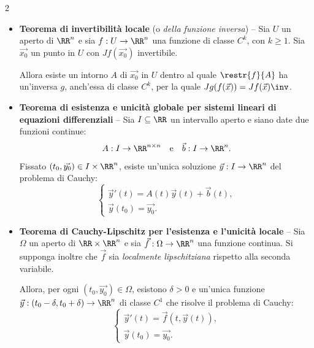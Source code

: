 \begin{multicols*}{2}
\begin{itemize}
            \item \textbf{Teorema di invertibilità locale} (o \textit{della funzione inversa}) -- Sia $U$ un aperto di $\RR^n$ e sia $f : U \to \RR^n$ una
                  funzione di classe $C^k$, con $k \geq 1$. Sia $\vec{x_0}$ un punto in $U$ con $J f(\vec{x_0})$ invertibile. \smallskip

                  Allora esiste un
                  intorno $A$ di $\vec{x_0}$ in $U$ dentro al quale $\restr{f}{A}$ ha un'inversa $g$, anch'essa di classe
                  $C^k$, per la quale $J g(f(\vec{x})) = J f(\vec{x})\inv$.

            \item \textbf{Teorema di esistenza e unicità globale per sistemi lineari di equazioni differenziali} --
                  Sia $I \subseteq \RR$ un intervallo aperto e siano date due funzioni continue:
                  \[ A : I \to \RR^{n \times n} \quad \text{e} \quad \vec{b} : I \to \RR^n. \]
                  Fissato $(t_0, \vec{y_0}) \in I \times \RR^n$, esiste un'unica soluzione $\vec{y} : I \to \RR^n$
                  del problema di Cauchy:
                  \[
                        \begin{cases}
                              \vec{y}'(t) = A(t)\vec{y}(t) + \vec{b}(t), \\
                              \vec{y}(t_0) = \vec{y_0}.
                        \end{cases}
                  \]

            \item \textbf{Teorema di Cauchy-Lipschitz per l'esistenza e l'unicità locale} --
                  Sia $\Omega$ un aperto di $\RR \times \RR^n$ e sia $\vec{f} : \Omega \to \RR^n$ una funzione continua.
                  Si supponga inoltre che $\vec{f}$ sia \emph{localmente lipschitziana} rispetto alla seconda variabile. \smallskip

                  Allora, per ogni $(t_0, \vec{y_0}) \in \Omega$, esistono $\delta > 0$ e un'unica funzione
                  $\vec{y} : (t_0 - \delta, t_0 + \delta) \to \RR^n$ di classe $C^1$ che risolve il problema di Cauchy:
                  \[
                        \begin{cases}
                              \vec{y}'(t) = \vec{f}(t, \vec{y}(t)), \\
                              \vec{y}(t_0) = \vec{y_0}.
                        \end{cases}
                  \]


\end{itemize}
\end{multicols*}
